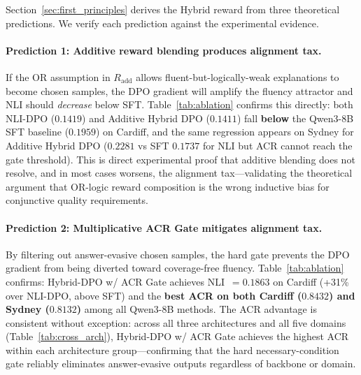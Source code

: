 Section~\ref{sec:first_principles} derives the Hybrid reward from three theoretical predictions. We verify each prediction against the experimental evidence.

\paragraph{Prediction 1: Additive reward blending produces alignment tax.}
If the OR assumption in $R_\text{add}$ allows fluent-but-logically-weak explanations to become chosen samples, the DPO gradient will amplify the fluency attractor and NLI should \emph{decrease} below SFT. Table~\ref{tab:ablation} confirms this directly: both NLI-DPO ($0.1419$) and Additive Hybrid DPO ($0.1411$) fall \textbf{below} the Qwen3-8B SFT baseline ($0.1959$) on Cardiff, and the same regression appears on Sydney for Additive Hybrid DPO ($0.2281$ vs SFT $0.1737$ for NLI but ACR cannot reach the gate threshold). This is direct experimental proof that additive blending does not resolve, and in most cases worsens, the alignment tax—validating the theoretical argument that OR-logic reward composition is the wrong inductive bias for conjunctive quality requirements.

\paragraph{Prediction 2: Multiplicative ACR Gate mitigates alignment tax.}
By filtering out answer-evasive chosen samples, the hard gate prevents the DPO gradient from being diverted toward coverage-free fluency. Table~\ref{tab:ablation} confirms: Hybrid-DPO w/ ACR Gate achieves NLI~$=0.1863$ on Cardiff (+31\% over NLI-DPO, above SFT) and the \textbf{best ACR on both Cardiff ($0.8432$) and Sydney ($0.8132$)} among all Qwen3-8B methods. The ACR advantage is consistent without exception: across all three architectures and all five domains (Table~\ref{tab:cross_arch}), Hybrid-DPO w/ ACR Gate achieves the highest ACR within each architecture group—confirming that the hard necessary-condition gate reliably eliminates answer-evasive outputs regardless of backbone or domain.

